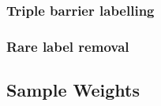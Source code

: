 \documentclass[12pt,a4paper,oneside]{article}
\begin{document}
\subsubsection{Triple barrier labelling}\label{subsubsec:tbl}

%


\subsubsection{Rare label removal}\label{subsubsec:rare}

%


\subsection{Sample Weights}\label{subsec:weights}
\end{document}
